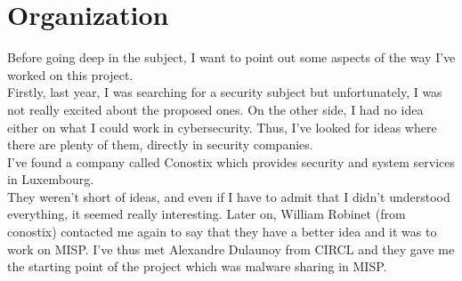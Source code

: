 \documentclass{eplmastersthesis}
\begin{document}
\section{Organization}
Before going deep in the subject, I want to point out some aspects of the way I've worked on this project.\\
Firstly, last year, I was searching for a security subject but unfortunately, I was not really excited about the proposed ones. On the other side, I had no idea either on what I could work in cybersecurity. Thus, I've looked for ideas where there are plenty of them, directly in security companies.\\
I've found a company called Conostix which provides security and system services in Luxembourg.\\
They weren't short of ideas, and even if I have to admit that I didn't understood everything, it seemed really interesting. Later on, William Robinet (from conostix) contacted me again to say that they have a better idea and it was to work on MISP. I've thus met Alexandre Dulaunoy from CIRCL and they gave me the starting point of the project which was malware sharing in MISP.\\
\end{document}
